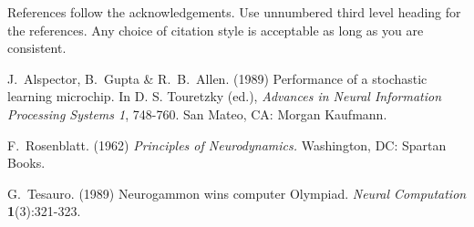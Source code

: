 References follow the acknowledgements.  Use unnumbered third level
heading for the references.  Any choice of citation style is
acceptable as long as you are consistent.


J.~Alspector, B.~Gupta \& R.~B.~Allen.  (1989) Performance of a
stochastic learning microchip.  In D. S. Touretzky (ed.), {\it
Advances in Neural Information Processing Systems 1}, 748-760.  San
Mateo, CA: Morgan Kaufmann.

F.~Rosenblatt. (1962) {\it Principles of Neurodynamics.}
Washington, DC: Spartan Books.

G.~Tesauro. (1989) Neurogammon wins computer Olympiad.  {\it Neural
Computation} {\bf 1}(3):321-323.


